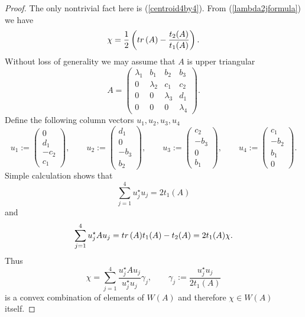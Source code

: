 \documentclass[10pt,a4paper,reqno]{amsart}
\newcommand{\zav}[1]{\left( #1 \right)}
\newcommand{\tr}{{\rm tr}\,}
\begin{document}
\begin{proof}
The only nontrivial fact here is (\ref{centroid4by4}). From (\ref{lambda2jformula}) we have
$$
\chi=\frac12\zav{\tr(A)-\frac{t_2(A)}{t_1(A)}}.
$$
Without loss of generality we may assume that $A$ is upper triangular
$$
A=\zav{\begin{array}{cccc}
\lambda_1 & b_1 & b_2 & b_3 \\
0 & \lambda_2 & c_1 & c_2 \\
0 & 0 & \lambda_3 & d_1 \\
0 & 0 & 0 & \lambda_4
\end{array}}.
$$ 
Define the following column vectors $u_1, u_2, u_3, u_4$
$$
u_1:=\zav{\begin{array}{c} 0 \\ d_1 \\ -c_2 \\ c_1 \end{array}},\qquad
u_2:=\zav{\begin{array}{c} d_1 \\ 0 \\ -b_3 \\ b_2 \end{array}},\qquad
u_3:=\zav{\begin{array}{c} c_2 \\ -b_3 \\ 0 \\ b_1 \end{array}},\qquad
u_4:=\zav{\begin{array}{c} c_1 \\ -b_2 \\ b_1 \\ 0 \end{array}}.
$$
%
Simple calculation shows that 
$$
\sum_{j=1}^4 u_j^\star u_j=2t_1(A)
$$
and
$$
\sum_{j=1}^4 u_j^\star A u_j= \tr(A)t_1(A)-t_2(A)=2t_1(A)\chi.
$$
Thus 
$$
\chi= \sum_{j=1}^4 \frac{u_j^\star A u_j}{u_j^\star u_j}\gamma_j,\qquad \gamma_j:=\frac{u_j^\star u_j}{2 t_1(A)}
$$
is a convex combination of elements of $W(A)$ and therefore $\chi\in W(A)$ itself. 
\end{proof}
\end{document}

